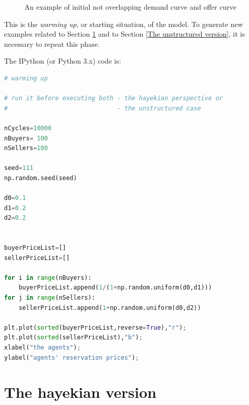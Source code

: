 \documentclass[12pt]{report}
\begin{document}
\begin{figure}[htbp]
\begin{center}
\caption{An example of initial not overlapping demand curve and offer curve}
\label{output_2_0.png}
\end{center}
\end{figure}

This is the \emph{warming up}, or starting situation, of the model. To generate new examples related to Section \ref{The hayekian version} and to Section \ref{The unstructured version}, it is necessary to repeat this phase.

The IPython (or Python 3.x) code is:

\begin{lstlisting}[language=Python, caption=Warming up of the model, basicstyle=\ttfamily\footnotesize]
# warming up

# run it before executing both - the hayekian perspective or
#                              - the unstructured case

nCycles=10000
nBuyers= 100
nSellers=100

seed=111
np.random.seed(seed)

d0=0.1
d1=0.2
d2=0.2


buyerPriceList=[]
sellerPriceList=[]

for i in range(nBuyers):
    buyerPriceList.append(1/(1+np.random.uniform(d0,d1)))
for j in range(nSellers):
    sellerPriceList.append(1+np.random.uniform(d0,d2))
    
plt.plot(sorted(buyerPriceList,reverse=True),"r");
plt.plot(sorted(sellerPriceList),"b");
xlabel("the agents");
ylabel("agents' reservation prices");
\end{lstlisting}

\section{The hayekian version}\label{The hayekian version}
 
\end{document}
